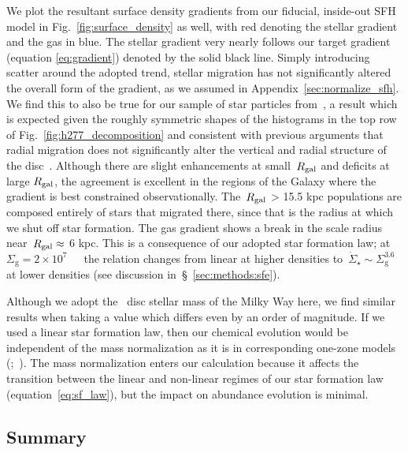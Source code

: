 \documentclass[draft2.tex]{subfiles}
\begin{document}
We plot the resultant surface density gradients from our fiducial, inside-out 
SFH model in Fig.~\ref{fig:surface_density} as well, with red denoting the 
stellar gradient and the gas in blue. 
The stellar gradient very nearly follows our target gradient (equation 
\ref{eq:gradient}) denoted by the solid black line. 
Simply introducing scatter around the adopted trend, stellar migration has 
not significantly altered the overall form of the gradient, as we assumed in 
Appendix~\ref{sec:normalize_sfh}. 
We find this to also be true for our sample of star particles from~\hsim, 
a result which is expected given the roughly symmetric shapes of the 
histograms in the top row of Fig.~\ref{fig:h277_decomposition} and consistent 
with previous arguments that radial migration does not significantly alter the 
vertical and radial structure of the disc~\citep[e.g.][]{Sellwood2014, 
VeraCiro2014}. 
Although there are slight enhancements at small~$R_\text{gal}$ and deficits at large 
$R_\text{gal}$, the agreement is excellent in the regions of the Galaxy where the 
gradient is best constrained observationally. 
The~$R_\text{gal}$ > 15.5 kpc populations are composed entirely of stars that 
migrated there, since that is the radius at which we shut off star formation. 
The gas gradient shows a break in the scale radius near~$R_\text{gal} \approx$ 
6 kpc. This is a consequence of our adopted star formation law; at 
$\Sigma_\text{g} = 2\times10^7$~\msun~\persqkpc~the relation changes from 
linear at higher densities to~$\dot{\Sigma}_\star \sim \Sigma_\text{g}^{3.6}$ 
at lower densities (see discussion in~\S~\ref{sec:methods:sfe}). 
\par 
Although we adopt the~\citet{Licquia2015} disc stellar mass of the Milky Way 
here, we find similar results when taking a value which differs even by an 
order of magnitude. 
If we used a linear star formation law, then our chemical evolution would be 
independent of the mass normalization as it is in corresponding one-zone 
models (\citealp*{Spitoni2017};~\citealp{Weinberg2017, Belfiore2019}). 
The mass normalization enters our calculation because it affects the transition 
between the linear and non-linear regimes of our star formation law 
(equation~\ref{eq:sf_law}), but the impact on abundance evolution is minimal. 

\subsection{Summary} 
\label{sec:methods:summary} 
\end{document}
